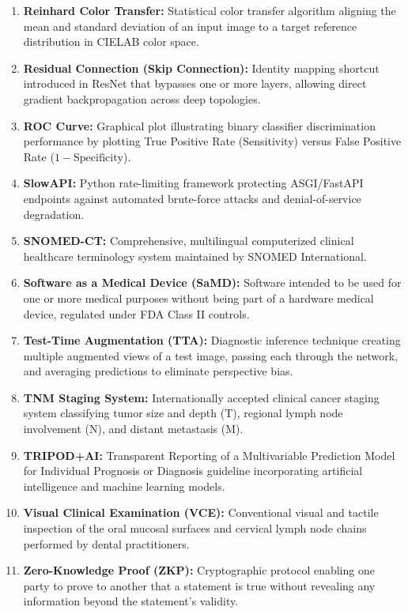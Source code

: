 \documentclass[12pt,a4paper,oneside]{report}
\begin{document}
\begin{enumerate}[label=\arabic*.]
    \item \textbf{Reinhard Color Transfer:} Statistical color transfer algorithm aligning the mean and standard deviation of an input image to a target reference distribution in CIELAB color space.
    \item \textbf{Residual Connection (Skip Connection):} Identity mapping shortcut introduced in ResNet that bypasses one or more layers, allowing direct gradient backpropagation across deep topologies.
    \item \textbf{ROC Curve:} Graphical plot illustrating binary classifier discrimination performance by plotting True Positive Rate (Sensitivity) versus False Positive Rate ($1 - \text{Specificity}$).
    \item \textbf{SlowAPI:} Python rate-limiting framework protecting ASGI/FastAPI endpoints against automated brute-force attacks and denial-of-service degradation.
    \item \textbf{SNOMED-CT:} Comprehensive, multilingual computerized clinical healthcare terminology system maintained by SNOMED International.
    \item \textbf{Software as a Medical Device (SaMD):} Software intended to be used for one or more medical purposes without being part of a hardware medical device, regulated under FDA Class II controls.
    \item \textbf{Test-Time Augmentation (TTA):} Diagnostic inference technique creating multiple augmented views of a test image, passing each through the network, and averaging predictions to eliminate perspective bias.
    \item \textbf{TNM Staging System:} Internationally accepted clinical cancer staging system classifying tumor size and depth (T), regional lymph node involvement (N), and distant metastasis (M).
    \item \textbf{TRIPOD+AI:} Transparent Reporting of a Multivariable Prediction Model for Individual Prognosis or Diagnosis guideline incorporating artificial intelligence and machine learning models.
    \item \textbf{Visual Clinical Examination (VCE):} Conventional visual and tactile inspection of the oral mucosal surfaces and cervical lymph node chains performed by dental practitioners.
    \item \textbf{Zero-Knowledge Proof (ZKP):} Cryptographic protocol enabling one party to prove to another that a statement is true without revealing any information beyond the statement's validity.
\end{enumerate}
\end{document}
